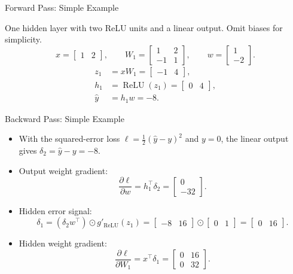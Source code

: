 \documentclass[10pt]{beamer}
\begin{document}
\begin{frame}{Forward Pass: Simple Example}

One hidden layer with two ReLU units and a linear output. Omit biases for simplicity.
\[
x=\begin{bmatrix}1 & 2\end{bmatrix},\qquad
W_1=\begin{bmatrix}1 & 2\\-1 & 1\end{bmatrix},\qquad
w=\begin{bmatrix}1\\-2\end{bmatrix}.
\]
\begin{align*}
z_1 &= xW_1 = \begin{bmatrix}-1 & 4\end{bmatrix},\\
h_1 &= \operatorname{ReLU}(z_1) = \begin{bmatrix}0 & 4\end{bmatrix},\\
\hat y &= h_1w = -8.
\end{align*}

\end{frame}

\begin{frame}{Backward Pass: Simple Example}
\begin{itemize}
\item With the squared-error loss $\ell=\tfrac12(\hat y-y)^2$ and $y=0$, the linear output gives $\delta_2=\hat y-y=-8$.
\item Output weight gradient:
\[
\frac{\partial\ell}{\partial w}=h_1^\top\delta_2
=\begin{bmatrix}0\\-32\end{bmatrix}.
\]
\item Hidden error signal:
\[
\delta_1=(\delta_2w^\top)\odot g'_{\text{ReLU}}(z_1)
=\begin{bmatrix}-8 & 16\end{bmatrix}\odot\begin{bmatrix}0 & 1\end{bmatrix}
=\begin{bmatrix}0 & 16\end{bmatrix}.
\]
\item Hidden weight gradient:
\[
\frac{\partial\ell}{\partial W_1}=x^\top\delta_1
=\begin{bmatrix}0 & 16\\0 & 32\end{bmatrix}.
\]
\end{itemize}
\end{frame}
\end{document}
